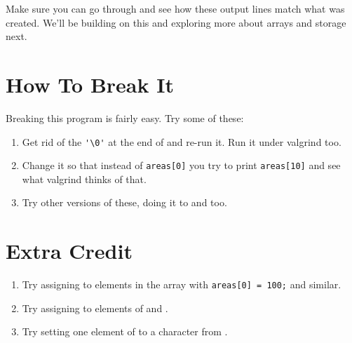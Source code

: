 Make sure you can go through and see how these output lines match
what was created.  We'll be building on this and exploring more
about arrays and storage next.

\section{How To Break It}

Breaking this program is fairly easy.  Try some of these:

\begin{enumerate}
\item Get rid of the \verb|'\0'| at the end of 
    and re-run it.  Run it under valgrind too.
\item Change it so that instead of \verb|areas[0]| you try to
    print \verb|areas[10]| and see what valgrind thinks of that.
\item Try other versions of these, doing it to  and
     too.
\end{enumerate}

\section{Extra Credit}

\begin{enumerate}
\item Try assigning to elements in the  array with \verb|areas[0] = 100;| and similar.
\item Try assigning to elements of  and .
\item Try setting one element of  to a character from .
\end{enumerate}

